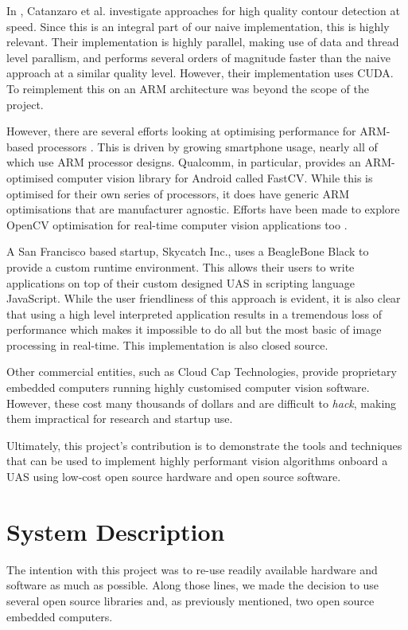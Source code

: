 \documentclass{acm_proc_article-sp}
\begin{document}
In \cite{catanzaro2009efficient}, Catanzaro et al. investigate approaches for high quality contour detection at speed. Since this is an integral part of our naive implementation, this is highly relevant. Their implementation is highly parallel, making use of data and thread level parallism, and performs several orders of magnitude faster than the naive approach at a similar quality level. However, their implementation uses CUDA. To reimplement this on an ARM architecture was beyond the scope of the project.

However, there are several efforts looking at optimising performance for ARM-based processors \cite{mitra2013use}. This is driven by growing smartphone usage, nearly all of which use ARM processor designs. Qualcomm, in particular, provides an ARM-optimised computer vision library for Android called FastCV. While this is optimised for their own series of processors, it does have generic ARM optimisations that are manufacturer agnostic. Efforts have been made to explore OpenCV optimisation for real-time computer vision applications too \cite{pulli2012real}.

A San Francisco based startup, Skycatch Inc., uses a BeagleBone Black to provide a custom runtime environment. This allows their users to write applications on top of their custom designed UAS in scripting language JavaScript. While the user friendliness of this approach is evident, it is also clear that using a high level interpreted application results in a tremendous loss of performance which makes it impossible to do all but the most basic of image processing in real-time. This implementation is also closed source. 

Other commercial entities, such as Cloud Cap Technologies, provide proprietary embedded computers running highly customised computer vision software. However, these cost many thousands of dollars and are difficult to \textit{hack}, making them impractical for research and startup use.

Ultimately, this project's contribution is to demonstrate the tools and techniques that can be used to implement highly performant vision algorithms onboard a UAS using low-cost open source hardware and open source software.

\section{System Description \label{sec:system-description}}
The intention with this project was to re-use readily available hardware and software as much as possible. Along those lines, we made the decision to use several open source libraries and, as previously mentioned, two open source embedded computers. 
\end{document}
